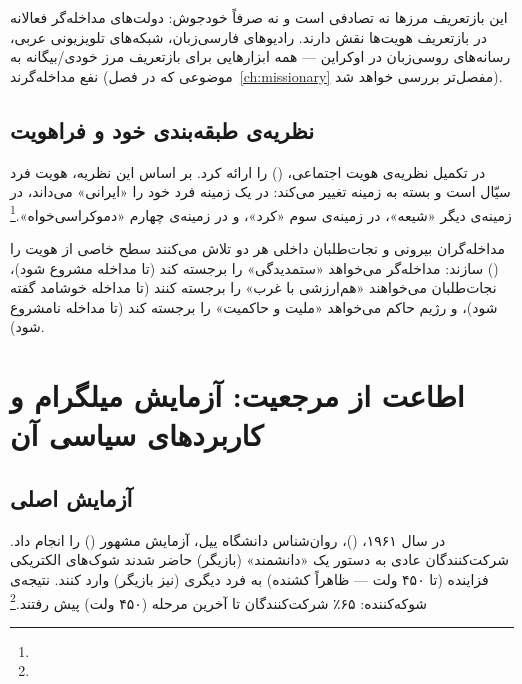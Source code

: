 این بازتعریف مرزها نه تصادفی است و نه صرفاً خودجوش: دولت‌های مداخله‌گر فعالانه در بازتعریف هویت‌ها نقش دارند. رادیوهای فارسی‌زبان، شبکه‌های تلویزیونی عربی، رسانه‌های روسی‌زبان در اوکراین — همه ابزارهایی برای بازتعریف مرز خودی/بیگانه به نفع مداخله‌گرند (موضوعی که در فصل~\ref{ch:missionary} مفصل‌تر بررسی خواهد شد).

\subsection{نظریه‌ی طبقه‌بندی خود و فراهویت}
\label{subsec:ch11-self-categorization}

 در تکمیل نظریه‌ی هویت اجتماعی،  () را ارائه کرد. بر اساس این نظریه، هویت فرد سیّال است و بسته به زمینه تغییر می‌کند: در یک زمینه فرد خود را «ایرانی» می‌داند، در زمینه‌ی دیگر «شیعه»، در زمینه‌ی سوم «کرد»، و در زمینه‌ی چهارم «دموکراسی‌خواه».\footnote{}

مداخله‌گران بیرونی و نجات‌طلبان داخلی هر دو تلاش می‌کنند سطح خاصی از هویت را  () سازند: مداخله‌گر می‌خواهد «ستمدیدگی» را برجسته کند (تا مداخله مشروع شود)، نجات‌طلبان می‌خواهند «هم‌ارزشی با غرب» را برجسته کنند (تا مداخله خوشامد گفته شود)، و رژیم حاکم می‌خواهد «ملیت و حاکمیت» را برجسته کند (تا مداخله نامشروع شود).


\section{اطاعت از مرجعیت: آزمایش میلگرام و کاربردهای سیاسی آن}
\label{sec:ch11-milgram}

\subsection{آزمایش اصلی}
\label{subsec:ch11-milgram-experiment}

در سال ۱۹۶۱،  ()، روان‌شناس دانشگاه ییل، آزمایش مشهور  () را انجام داد. شرکت‌کنندگان عادی به دستور یک «دانشمند» (بازیگر) حاضر شدند شوک‌های الکتریکی فزاینده (تا ۴۵۰ ولت — ظاهراً کشنده) به فرد دیگری (نیز بازیگر) وارد کنند. نتیجه‌ی شوکه‌کننده: ۶۵٪ شرکت‌کنندگان تا آخرین مرحله (۴۵۰ ولت) پیش رفتند.\footnote{}

